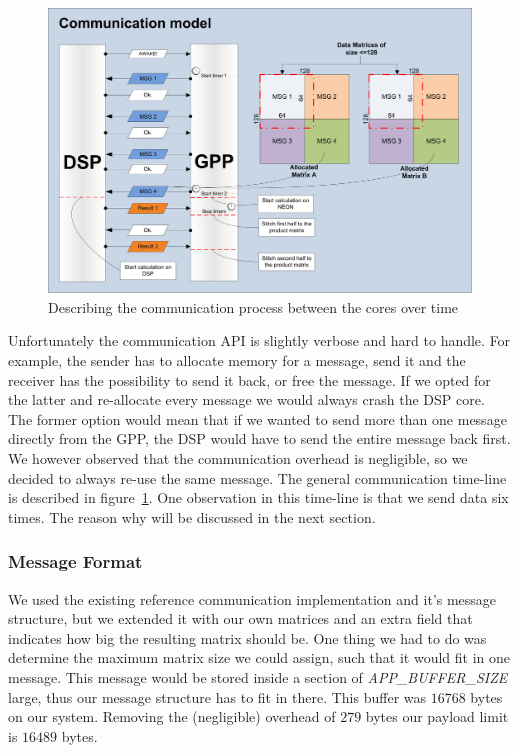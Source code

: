 \begin{figure}[h]
\includegraphics[width=\textwidth]{images/gpp_dsp_com}
\caption{Describing the communication process between the cores over time}
\label{fig:gpp_dsp_com}
\end{figure}

Unfortunately the communication API is slightly verbose and hard to handle.
For example, the sender has to allocate memory for a message, send it and the
receiver has the possibility to send it back, or free the message. If we opted
for the latter and re-allocate every message we would always crash the DSP core.
The former option would mean that if we wanted to send more than one message
directly from the GPP, the DSP would have to send the entire message back first.
We however observed that the communication overhead is negligible, so we
decided to always re-use the same message. The general communication time-line
is described in figure~\ref{fig:gpp_dsp_com}. One observation in this time-line
is that we send data six times. The reason why will be discussed in the next
section.

\subsubsection{Message Format}
We used the existing reference communication implementation and it's message
structure, but we extended it with our own matrices and an extra field that
indicates how big the resulting matrix should be. One thing we had to do
was determine the maximum matrix size we could assign, such that it would fit
in one message. This message would be stored inside a section of
\emph{APP\_BUFFER\_SIZE} large, thus our message structure has to fit in there.
This buffer was $16768$ bytes on our system.
Removing the (negligible) overhead of $279$ bytes our payload limit is $16489$ bytes.

